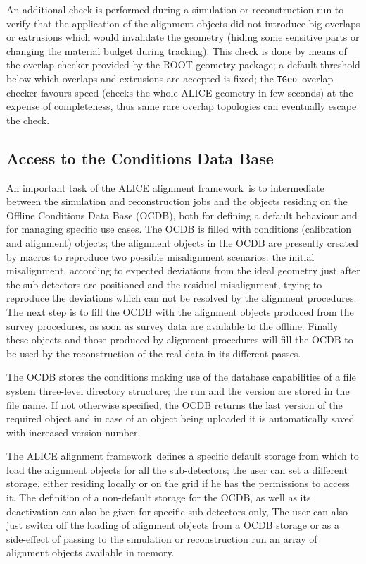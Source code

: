 \documentclass[12pt,a4paper,twoside]{article}
\makeatletter
\newcommand {\ROOT} {ROOT\@\xspace}
\newcommand{\FR}{ALICE alignment framework}
\newcommand{\tgeo}{\lstinline!TGeo!}
\makeatother
\begin{document}
{An additional check is performed during a simulation or reconstruction
run to verify that the
application of the alignment objects did not introduce big overlaps
or extrusions which would invalidate the geometry (hiding some
sensitive parts or changing the material budget during tracking). This
check is done by means of the overlap checker provided by the
\ROOT geometry package; a default threshold below which overlaps and
extrusions are accepted is fixed; the \tgeo\ overlap checker favours speed
(checks the whole ALICE geometry in few seconds) at the expense of
completeness, thus same rare overlap topologies can eventually escape
the check.

\subsection{Access to the Conditions Data Base}
\label{sec:CDBaccess}
An important task of the \FR\ is to intermediate between the
simulation and reconstruction jobs and the objects residing on the
Offline Conditions Data Base (OCDB), both for defining a default
behaviour and for managing specific use cases. The OCDB is filled
with conditions (calibration and alignment) objects; the alignment
objects in the OCDB are presently created by macros to reproduce two
possible misalignment scenarios: the initial misalignment, according
to expected deviations from the ideal geometry just after the
sub-detectors are positioned and the residual misalignment, trying to
reproduce the deviations which can not be resolved by the alignment
procedures. The next step is to fill the OCDB with the alignment
objects produced from the survey procedures, as soon as survey data
are available to the offline. Finally these objects and those produced
by alignment procedures will fill the OCDB to be used by the
reconstruction of the real data in its different passes.

The OCDB stores the conditions making use of the database capabilities
of a file system three-level directory structure; the run and the
version are stored in the file name.
If not otherwise specified, the OCDB returns the last version of the 
required object and in case of an object being uploaded it is
automatically saved with increased version number.

The \FR\ defines a specific default storage from which to load the
alignment objects for all the sub-detectors; the user can set a
different storage, either residing locally or on the grid if he has
the permissions to access it. The definition of a non-default storage
for the OCDB, as well as its deactivation can also be given for
specific sub-detectors only, The user can also just switch off the
loading of alignment objects from a OCDB storage or as a side-effect
of passing to the simulation or reconstruction run an array of
alignment objects available in memory.

}
\end{document}
